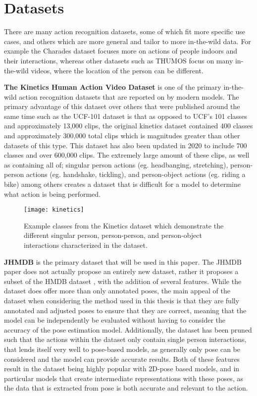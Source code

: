 \section{Datasets}
\label{sec:datasets}

There are many action recognition datasets, some of which fit more specific use cases, and others which are more general and tailor to more in-the-wild data. For example the Charades dataset \cite{charades} focuses more on actions of people indoors and their interactions, whereas other datasets such as THUMOS \cite{THUMOS15} focus on many in-the-wild videos, where the location of the person can be different.

\textbf{The Kinetics Human Action Video Dataset} \cite{kinetics} is one of the primary in-the-wild action recognition datasets that are reported on by modern models. The primary advantage of this dataset over others that were published around the same time such as the UCF-101 dataset \cite{ucf101} is that as opposed to UCF's 101 classes and approximately 13,000 clips, the original kinetics dataset contained 400 classes and approximately 300,000 total clips which is magnitudes greater than other datasets of this type. This dataset has also been updated in 2020 to include 700 classes and over 600,000 clips. The extremely large amount of these clips, as well as containing all of; singular person actions (eg. headbanging, stretching), person-person actions (eg. handshake, tickling), and person-object actions (eg. riding a bike) among others creates a dataset that is difficult for a model to determine what action is being performed.

\begin{figure}[ht]
	\texttt{[image: kinetics]}
	\centering
	\caption{Example classes from the Kinetics dataset \cite{kinetics} which demonstrate the different singular person, person-person, and person-object interactions characterized in the dataset.}
	\label{fig:kinetics}
\end{figure}

\textbf{JHMDB} \cite{JHMDB} is the primary dataset that will be used in this paper. The JHMDB paper does not actually propose an entirely new dataset, rather it proposes a subset of the HMDB dataset \cite{hmdb}, with the addition of several features. While the dataset does offer more than only annotated poses, the main appeal of the dataset when considering the method used in this thesis is that they are fully annotated and adjusted poses to ensure that they are correct, meaning that the model can be independently be evaluated without having to consider the accuracy of the pose estimation model. Additionally, the dataset has been pruned such that the actions within the dataset only contain single person interactions, that lends itself very well to pose-based models, as generally only pose can be considered and the model can provide accurate results. Both of these features result in the dataset being highly popular with 2D-pose based models, and in particular models that create intermediate representations with these poses, as the data that is extracted from pose is both accurate and relevant to the action.


